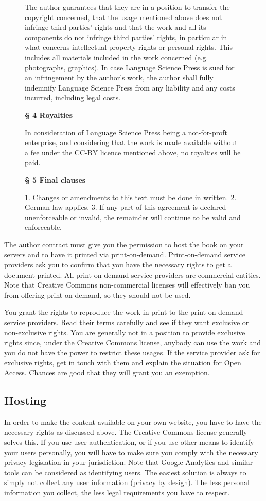 \documentclass[guidelines,nonflat,modfonts] {langsci/langscibook}
\begin{document}
\begin{figure}
{{The author guarantees that they are in a position to transfer the copyright concerned, that the usage mentioned above does not infringe third parties' rights and that the work and all its components do not infringe third parties' rights, in particular in what concerns intellectual property rights or personal rights. This includes all materials included in the work concerned (e.g. photographs, graphics). In case Language Science Press is sued for an infringement by the author's work, the author shall fully indemnify Language Science Press from any liability and any costs incurred, including legal costs. 

\medskip\noindent
\textbf{§ 4 Royalties}

In consideration of Language Science Press being a not-for-proft enterprise, and considering that the work is made available without a fee under the CC-BY licence mentioned above, no royalties will be paid. 

\medskip\noindent
\textbf{§ 5 Final clauses}

1. Changes or amendments to this text must be done in written.
2. German law applies.
3. If any part of this agreement is declared unenforceable or invalid, the remainder will continue to be valid and enforceable.
 }
}
\end{figure}


The author contract must give you the permission to host the book on your servers and to have it printed via print-on-demand.
Print-on-demand service providers ask you to confirm that you have the necessary rights to get a document printed. 
All print-on-demand service providers are commercial entities. Note that Creative Commons non-commercial licenses will effectively ban you from offering print-on-demand, so they should not be used. 

You grant the rights to reproduce the work in print to the print-on-demand service providers. Read their terms carefully and see if they want exclusive or non-exclusive rights. You are generally not in a position to provide exclusive rights since, under the Creative Commons license, anybody can use the work and you do not have the power to restrict these usages. If the service provider ask for exclusive rights, get in touch with them and explain the situation for Open Access. Chances are good that they will grant you an exemption. 

\subsection{Hosting}
In order to make the content available on your own website, you have to have the necessary rights as discussed above. The Creative Commons license generally solves this. If you use user authentication, or if you use other means to identify your users personally, you will have to make sure you comply with the necessary privacy legislation in your jurisdiction. Note that Google Analytics and similar tools can be considered as identifying users. The easiest solution is always to simply not collect any user information (privacy by design). The less personal information you collect, the less legal requirements you have to respect. 
\end{document}
